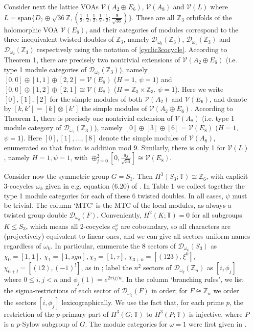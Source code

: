 \documentclass[12pt]{article}
\numberwithin{equation}{section}
\def\cD            {{\mathcal{D}}}
\def\cV            {{\mathcal{V}}}
\def\bbT           {\mathbb{T}}
\def\bbZ           {\mathbb{Z}}
\begin{document}
Consider next the lattice VOAs $\cV(A_2\oplus E_6)$, $\cV(A_8)$ and $\cV(L)$ where $L=\mathrm{span}\{D_7\oplus\sqrt{36}\bbZ,(\frac{1}{2},\frac{1}{2},\frac{1}{2},\frac{1}{2},\frac{1}{2};\frac{9}{\sqrt{36}})\}$. These are all
$\bbZ_3$ orbifolds of the holomorphic VOA $\cV(E_8)$, and their categories of modules correspond to the  three inequivalent twisted doubles of $\bbZ_3$, namely $\cD_{\omega_0}(\bbZ_3)$, $\cD_{\omega_1}(\bbZ_3)$ and $\cD_{\omega_2}(\bbZ_3)$ respectively using the notation of \eqref{cyclic3cocycle}. According to Theorem 1, there are
precisely two nontrivial extensions of $\cV(A_2\oplus E_6)$ (i.e. type 1 module categories of $\cD_{\omega_0}(\bbZ_3)$),
namely $[0,0]\oplus[1,1]\oplus[2,2]=\cV(E_8)$ ($H=1$, $\psi=1$) and  $[0,0]\oplus[1,2]\oplus[2,1]\cong\cV(E_8)$ ($H=\bbZ_3\times\bbZ_3$, $\psi=1$). Here we write 
$[0],[1],[2]$ for the simple modules of both $\cV(A_2)$ and $\cV( E_6)$, and denote by $[k,k']=[k]\otimes
[k']$ the simple modules of $\cV(A_2\oplus E_6)$.
According to Theorem 1, there is
precisely one nontrivial extension of $\cV(A_8)$ (i.e. type 1 module category of $\cD_{\omega_1}(\bbZ_3)$),
namely $[0]\oplus[3]\oplus[6]=\cV(E_8)$ ($H=1$, $\psi=1$). Here $[0],[1],\ldots,[8]$ denote the
simple modules of $\cV(A_8)$, enumerated so that fusion is addition mod 9. Similarly, there is only 1 for  $\cV(L)$, namely $H=1,\psi=1$, with $\oplus_{j=0}^2[0,\frac{9j}{\sqrt{36}}]\cong\cV(E_8)$.

Consider now the symmetric group $G=S_3$. Then $H^3(S_3;\bbT)\cong\bbZ_6$, with explicit 3-cocycles $\omega_k$ given in e.g. equation (6.20) of \cite{CGR}. In Table 1 we collect together the type 1 module categories for each of these 6 twisted doubles. In all cases, $\psi$ must be trivial. The column `MTC' is the MTC of the local modules, as always a twisted group double $\cD_{\omega_q}(F)$. Conveniently,  $H^2(K;\bbT)=0$ for all subgroups $K\le S_3$, which means all 2-cocycles $c^\omega_g$ are coboundary, so all characters are (projectively) equivalent to linear ones, and we can give all
sectors uniform names regardless of $\omega_k$.  In particular, enumerate the 8 sectors of $\cD_{\omega_k}(S_3)$ as $\chi_0=[1,\mathbf{1}]$, $\chi_1=[1,sgn],\chi_2=[1,\tau]$, $\chi_{3+k}=[(123),\xi^k]$, $\chi_{6+l}=[(12),(-1)^l]$, as in \cite{EP1}; label the $n^2$ sectors of $\cD_{\omega_q}(\bbZ_n)$
as $[i,\phi_j]$ where $0\le i,j<n$ and $\phi_j(1)=e^{2\pi ij/n}$.  In the column `branching rules', we list the sigma-restrictions of each
sector of $\cD_{\omega_q}(F)$ in order; for $F\cong \bbZ_n$ we order the sectors $[i,\phi_j]$  lexicographically.  We use the fact that,
for each prime $p$, the restriction of the $p$-primary part of $H^3(G;\bbT)$ to $H^3(P;\bbT)$ is injective, where
$P$ is a $p$-Sylow subgroup of $G$.
The module categories for $\omega=1$ were first given in \cite{EP1}.
\end{document}
